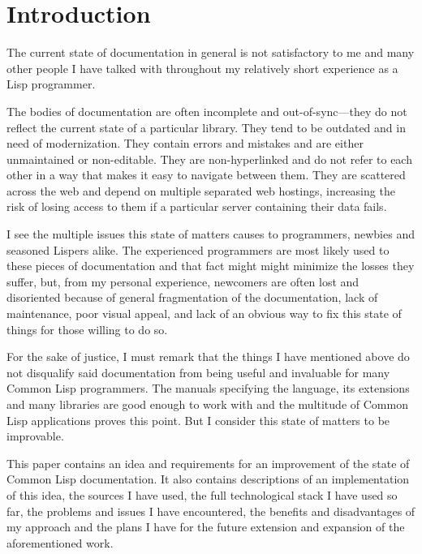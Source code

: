\section{Introduction}

The current state of \cl{} documentation in general is not satisfactory to me and many other people I have talked with throughout my relatively short experience as a Lisp programmer.

The bodies of documentation are often incomplete and out-of-sync---they do not reflect the current state of a particular library. They tend to be outdated and in need of modernization. They contain errors and mistakes and are either unmaintained or non-editable. They are non-hyperlinked and do not refer to each other in a way that makes it easy to navigate between them. They are scattered across the web and depend on multiple separated web hostings, increasing the risk of losing access to them if a particular server containing their data fails.

I see the multiple issues this state of matters causes to \cl{} programmers, newbies and seasoned Lispers alike. The experienced programmers are most likely used to these pieces of documentation and that fact might might minimize the losses they suffer, but, from my personal experience, newcomers are often lost and disoriented because of general fragmentation of the documentation, lack of maintenance, poor visual appeal, and lack of an obvious way to fix this state of things for those willing to do so.

For the sake of justice, I must remark that the things I have mentioned above do not disqualify said documentation from being useful and invaluable for many Common Lisp programmers. The manuals specifying the language, its extensions and many libraries are good enough to work with and the multitude of Common Lisp applications proves this point. But I consider this state of matters to be improvable.

This paper contains an idea and requirements for an improvement of the state of Common Lisp documentation. It also contains descriptions of an implementation of this idea, the sources I have used, the full technological stack I have used so far, the problems and issues I have encountered, the benefits and disadvantages of my approach and the plans I have for the future extension and expansion of the aforementioned work.

